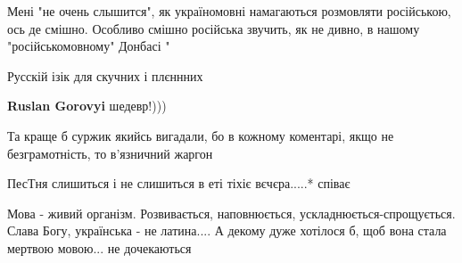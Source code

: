 Мені "не очень слышится", як україномовні намагаються розмовляти російською,
ось де смішно. Особливо смішно російська звучить, як не дивно, в нашому
"російськомовному" Донбасі "


 

Русскій ізік для скучних і плєннних

\begin{itemize}
 
\textbf{Ruslan Gorovyi} шедевр!)))
\end{itemize}

 
Та краще б суржик якийсь вигадали, бо в кожному коментарі, якщо не безграмотність, то в'язничний жаргон

 
ПесТня слишиться і не слишиться в еті тіхіє вєчєра.....* співає

 

Мова - живий організм. Розвивається, наповнюється, ускладнюється-спрощується.
Слава Богу, українська - не латина.... А декому дуже хотілося б, щоб вона стала
мертвою мовою... не дочекаються


 
